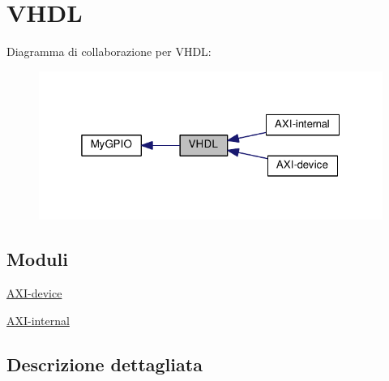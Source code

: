 \hypertarget{group___v_h_d_l}{\section{V\+H\+D\+L}
\label{group___v_h_d_l}
}
Diagramma di collaborazione per V\+H\+D\+L\+:\nopagebreak
\begin{figure}[H]
\begin{center}
\leavevmode
\includegraphics[width=319pt]{group___v_h_d_l}
\end{center}
\end{figure}
\subsection*{Moduli}
\begin{DoxyCompactItemize}
\item 
\hyperlink{group___a_x_i-device}{A\+X\+I-\/device}
\item 
\hyperlink{group___a_x_i-internal}{A\+X\+I-\/internal}
\end{DoxyCompactItemize}


\subsection{Descrizione dettagliata}
